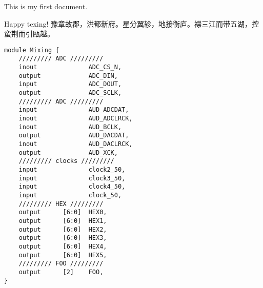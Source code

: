 \documentclass{article}
\begin{document}
This is my first document.

Happy texing!
豫章故郡，洪都新府。星分翼轸，地接衡庐。襟三江而带五湖，控蛮荆而引瓯越。

\begin{lstlisting}[style={verilog-style}]
module Mixing {
    ///////// ADC /////////
    inout              ADC_CS_N,
    output             ADC_DIN,
    input              ADC_DOUT,
    output             ADC_SCLK,
    ///////// ADC /////////
    input              AUD_ADCDAT,
    inout              AUD_ADCLRCK,
    inout              AUD_BCLK,
    output             AUD_DACDAT,
    inout              AUD_DACLRCK,
    output             AUD_XCK,
    ///////// clocks /////////
    input              clock2_50,
    input              clock3_50,
    input              clock4_50,
    input              clock_50,
    ///////// HEX /////////
    output      [6:0]  HEX0,
    output      [6:0]  HEX1,
    output      [6:0]  HEX2,
    output      [6:0]  HEX3,
    output      [6:0]  HEX4,
    output      [6:0]  HEX5,
    ///////// FOO /////////
    output      [2]    FOO,
}
\end{lstlisting}
\end{document}
